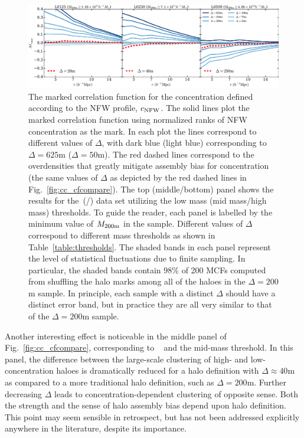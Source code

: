 \documentclass[usenatbib,fleqn]{mnras}
\begin{document}
\begin{figure}
	\centering
	\includegraphics[width=\textwidth]{all_mcf_cNFW.pdf}
	\caption{
The marked correlation function for the concentration defined according to the NFW profile, $c_{\rm NFW}$. The solid lines plot the marked correlation function using normalized ranks of NFW concentration as the mark. In each plot the lines correspond to different values of $\Delta$, with dark blue (light blue) corresponding to $\Delta = 625$m ($\Delta = 50$m). The red dashed lines correspond to the overdensities that greatly mitigate assembly bias for concentration (the same values of $\Delta$ as depicted by the red dashed lines in Fig.~\ref{fig:cc_cfcompare}). The top (middle/bottom) panel shows the results for the\simA \ (\simB /\simC) data set utilizing the low mass (mid mass/high mass) thresholds. To guide the reader, each panel is labelled by the minimum value of $M_{200{\rm m}}$ in the sample. Different values of $\Delta$ correspond to different mass thresholds as shown in Table~\ref{table:thresholds}. The shaded bands in each panel represent the level of statistical fluctuations due to finite sampling. In particular, the shaded bands contain $98\%$ of 200 MCFs computed from shuffling the halo marks among all of the haloes in the $\Delta=200$m sample. In principle, each sample with a distinct $\Delta$ should have a distinct error band, but in practice they are all very similar to that of the $\Delta=200$m sample.
}
\label{fig:cc_mcf_cnfw}
\end{figure}

Another interesting effect is noticeable in the middle panel of Fig.~\ref{fig:cc_cfcompare}, corresponding to \simB~ and the mid-mass threshold. In this panel, the difference between the large-scale clustering of high- and low-concentration haloes is dramatically reduced for a halo definition with $\Delta \approx 40$m as compared to a more traditional halo definition, such as $\Delta=200$m. Further decreasing $\Delta$ leads to concentration-dependent clustering of opposite sense. Both the strength and the sense of halo assembly bias depend upon halo definition. This point may seem sensible in retrospect, but has not been addressed explicitly anywhere in the literature, despite its importance.
\end{document}
